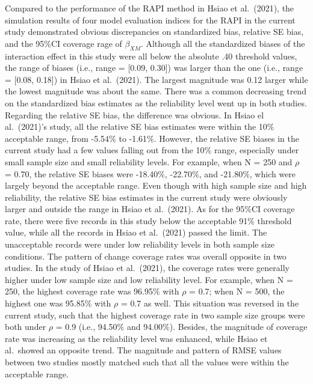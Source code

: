 \documentclass[
  man]{apa7}
\begin{document}
Compared to the performance of the RAPI method in Hsiao et al.~(2021), the simulation results of four model evaluation indices for the RAPI in the current study demonstrated obvious discrepancies on standardized bias, relative SE bias, and the 95\(\%\)CI coverage rage of \(\beta_{XM}\). Although all the standardized biases of the interaction effect in this study were all below the absolute .40 threshold values, the range of biases (i.e., range = {[}0.09, 0.30{]}) was larger than the one (i.e., range = {[}0.08, 0.18{]}) in Hsiao et al.~(2021). The largest magnitude was 0.12 larger while the lowest magnitude was about the same. There was a common decreasing trend on the standardized bias estimates as the reliability level went up in both studies. Regarding the relative SE bias, the difference was obvious. In Hsiao el al.~(2021)'s study, all the relative SE bias estimates were within the 10\(\%\) acceptable range, from -5.54\(\%\) to -1.61\(\%\). However, the relative SE biases in the current study had a few values falling out from the 10\(\%\) range, especially under small sample size and small reliability levels. For example, when N = 250 and \(\rho\) = 0.70, the relative SE biases were -18.40\(\%\), -22.70\(\%\), and -21.80\(\%\), which were largely beyond the acceptable range. Even though with high sample size and high reliability, the relative SE bias estimates in the current study were obviously larger and outside the range in Hsiao et al.~(2021). As for the 95\(\%\)CI coverage rate, there were five records in this study below the acceptable 91\(\%\) threshold value, while all the records in Hsiao et al.~(2021) passed the limit. The unacceptable records were under low reliability levels in both sample size conditions.
The pattern of change coverage rates was overall opposite in two studies. In the study of Hsiao et al.~(2021), the coverage rates were generally higher under low sample size and low reliability level. For example, when N = 250, the highest coverage rate was 96.95\(\%\) with \(\rho\) = 0.7; when N = 500, the highest one was 95.85\(\%\) with \(\rho\) = 0.7 as well. This situation was reversed in the current study, such that the highest coverage rate in two sample size groups were both under \(\rho\) = 0.9 (i.e., 94.50\(\%\) and 94.00\(\%\)). Besides, the magnitude of coverage rate was increasing as the reliability level was enhanced, while Hsiao et al.~showed an opposite trend. The magnitude and pattern of RMSE values between two studies mostly matched such that all the values were within the acceptable range.
\end{document}
